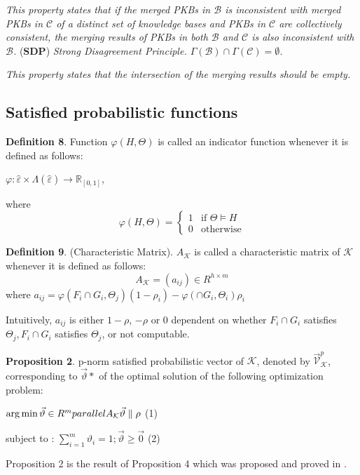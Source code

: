\documentclass[]{iosart2c}
\begin{document}
  \textit{This property states that if the merged PKBs in $\mathcal{B}$ is inconsistent with merged PKBs in $\mathcal{C}$ of a distinct set of knowledge bases and PKBs in $\mathcal{C}$ are collectively consistent, the merging results of PKBs in both $\mathcal{B}$ and $\mathcal{C}$ is also inconsistent with $\mathcal{B}$.
  }
  (\textbf{SDP}) \textit{Strong Disagreement Principle. $\Gamma(\mathcal{B}) \cap \Gamma(\mathcal{C}) = \emptyset$.}

  \textit{This property states that the intersection of the merging results should be empty.
  }

  \subsection{Satisfied probabilistic functions}

  \textbf{Definition 8}. Function $\varphi(H,\Theta)$ is called an indicator function whenever it is defined as follows:

  $\varphi : \hat{\varepsilon} \times \Lambda(\hat{\varepsilon}) \to \mathbb{R}_{[0,1]}$,

  where $$\varphi(H,\Theta) =
  \begin{cases}
    1    &\text{if $\Theta \models H$} \\
    0    &\text{otherwise}
  \end{cases}
  $$

  \textbf{Definition 9}. (Characteristic Matrix). $A_\mathcal{K}$ is called a characteristic matrix of $\mathcal{K}$ whenever it is defined as follows:
  $$
  A_\mathcal{K} = (a_{ij}) \in R^{h \times m}
  $$
  where
  $a_{ij} = \varphi(F_i \cap G_i,\Theta_j)(1 - \rho_i) - \varphi(\cap G_i,\Theta_i)\rho_i$

  Intuitively, $a_{ij}$ is either $1-\rho$, $-\rho$ or 0 dependent on whether $F_i \cap G_i$ satisfies $\Theta_j, F_i \cap G_i$ satisfies $\Theta_j$, or not computable.

  \textbf{Proposition 2}. p-norm satisfied probabilistic vector of $\mathcal{K}$, denoted by $\vec{\mathcal{V}}^p_\mathcal{K}$, corresponding to $\vec{\vartheta}*$ of the optimal solution of the following optimization problem:

  $\arg \min\vec{\vartheta}\in R^m\\parallel A_\mathcal{K} \vec{\vartheta}\parallel\rho$ (1)

  subject to : $\sum^m_{i=1}\vartheta_i = 1; \vec{\vartheta}\geq\vec{0}$ (2)

  Proposition 2 is the result of Proposition 4 which was proposed and proved in \cite{10}.
\end{document}
